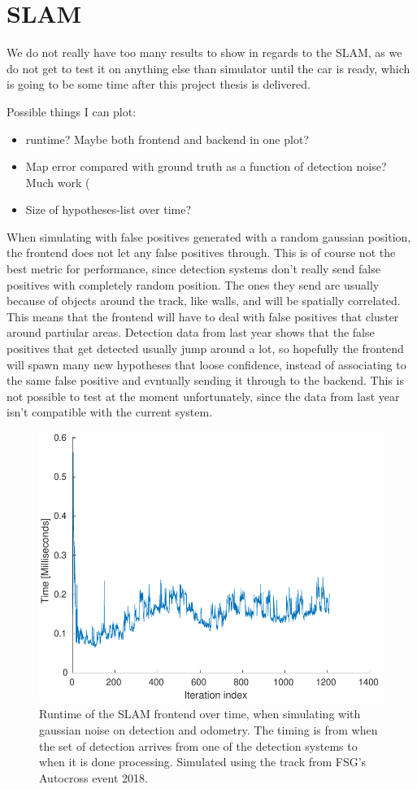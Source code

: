 \section{SLAM}

We do not really have too many results to show in regards to the SLAM, as we do not get to test it on anything else than simulator until the car is ready, which is going to be some time after this project thesis is delivered. 

Possible things I can plot:
\begin{itemize}
    \item runtime? Maybe both frontend and backend in one plot?
    \item Map error compared with ground truth as a function of detection noise? Much work \:(
    \item Size of hypotheses-list over time?
\end{itemize}

When simulating with false positives generated with a random gaussian position, the frontend does not let any false positives through. This is of course not the best metric for performance, since detection systems don't really send false positives with completely random position. The ones they send are usually because of objects around the track, like walls, and will be spatially correlated. This means that the frontend will have to deal with false positives that cluster around partiular areas. Detection data from last year shows that the false positives that get detected usually jump around a lot, so hopefully the frontend will spawn many new hypotheses that loose confidence, instead of associating to the same false positive and evntually sending it through to the backend. This is not possible to test at the moment unfortunately, since the data from last year isn't compatible with the current system. 

\begin{figure}
    \centering
    \includegraphics[width=0.8\linewidth]{0_Images/6_Results/FrontendTiming.pdf}
    \caption[Runtime of the SLAM frontend.]
    {Runtime of the SLAM frontend over time, when simulating with gaussian noise on detection and odometry. The timing is from when the set of detection arrives from one of the detection systems to when it is done processing. Simulated using the track from FSG's Autocross event 2018.}
    \label{Fig:FrontendTiming}
\end{figure}

